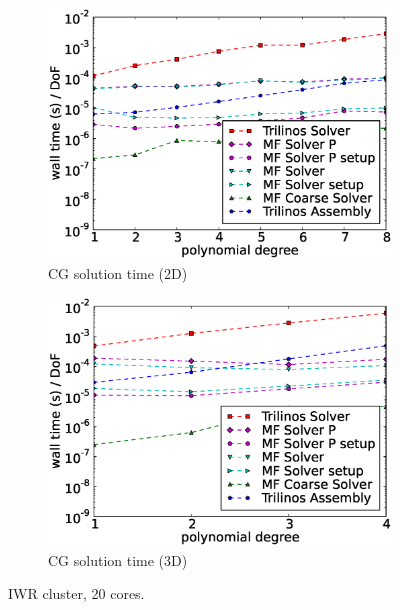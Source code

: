\documentclass[AMA,STIX1COL]{WileyNJD-v2}
\begin{document}
\begin{figure}[!ht]
\begin{subfigure}[b]{0.49\textwidth}
    \includegraphics[width=\textwidth]{IWR_newest_patched_solver2d.eps}
    \caption{CG solution time (2D)}
    \label{fig:benchmark_miehe_IWR_sol2}
  \end{subfigure}
  \begin{subfigure}[b]{0.49\textwidth}
    \centering
    \includegraphics[width=\textwidth]{IWR_newest_patched_solver3d.eps}
    \caption{CG solution time (3D)}
    \label{fig:benchmark_miehe_IWR_sol3}
  \end{subfigure}
  \caption{IWR cluster, 20 cores.}%
  \label{fig:benchmark_miehe_IWR_cg}
\end{figure}
\end{document}
